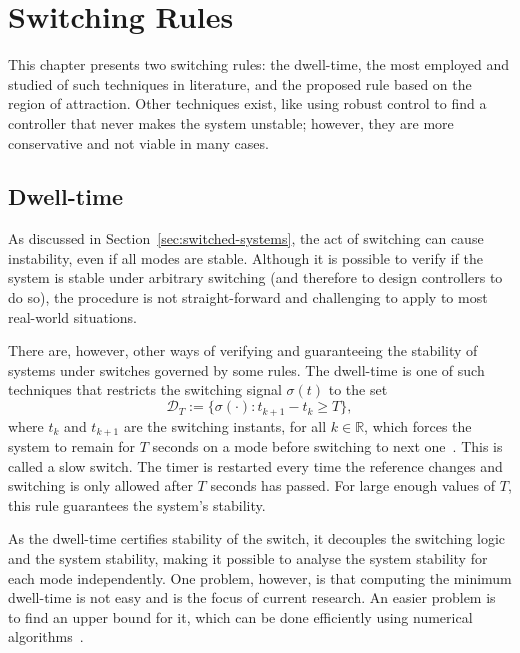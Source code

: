 
\chapter{Switching Rules}%
\label{chp:switching-rules}

This chapter presents two switching rules: the dwell-time, the most employed and
studied of such techniques in literature, and the proposed rule based on the
region of attraction. Other techniques exist, like using robust control to find
a controller that never makes the system unstable; however, they are more
conservative and not viable in many cases.

\section{Dwell-time}%
\label{sec:dwell-time}

As discussed in Section~\ref{sec:switched-systems}, the act of switching can
cause instability, even if all modes are stable. Although it is possible to
verify if the system is stable under arbitrary switching (and therefore to
design controllers to do so), the procedure is not straight-forward and
challenging to apply to most real-world situations.

There are, however, other ways of verifying and guaranteeing the stability of
systems under switches governed by some rules. The dwell-time is one of such
techniques that restricts the switching signal \(\sigma{}(t)\) to the set
%
\begin{equation}
	\mathcal{D}_{T} := \{\sigma(\cdot):t_{k+1}-t_{k}\ge{}T\},
\end{equation}
%
where \(t_{k}\) and \(t_{k+1}\) are the switching instants, for all
\(k\in{}\mathbb{R}\), which forces the system to remain for \(T\) seconds on a
mode before switching to next one~\parencite{colaneri:dwell}. This is called a
slow switch. The timer is restarted every time the reference changes and
switching is only allowed after \(T\) seconds has passed.  For large enough
values of \(T\), this rule guarantees the system's stability.

As the dwell-time certifies stability of the switch, it decouples the switching
logic and the system stability, making it possible to analyse the system
stability for each mode independently. One problem, however, is that computing
the minimum dwell-time is not easy and is the focus of current research. An
easier problem is to find an upper bound for it, which can be done efficiently
using numerical algorithms~\parencite{colaneri:dwell}.


